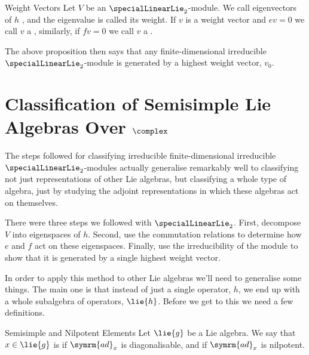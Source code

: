 \documentclass[fleqn]{NotesClass}
\newcommand{\ad}{\symrm{ad}}
\begin{document}
    \begin{dfn}{Weight Vectors}{}
        Let \(V\) be an \(\specialLinearLie_2\)-module.
        We call eigenvectors of \(h\) , and the eigenvalue is called its weight.
        If \(v\) is a weight vector and \(ev = 0\) we call \(v\) a , similarly, if \(fv = 0\) we call \(v\) a .
    \end{dfn}
    
    The above proposition then says that any finite-dimensional irreducible \(\specialLinearLie_2\)-module is generated by a highest weight vector, \(v_0\).
    
    \section{Classification of Semisimple Lie Algebras Over \texorpdfstring{\(\complex\)}{C}}
    The steps followed for classifying irreducible finite-dimensional irreducible \(\specialLinearLie_2\)-modules actually generalise remarkably well to classifying not just representations of other Lie algebras, but classifying a whole type of algebra, just by studying the adjoint representations in which these algebras act on themselves.
    
    There were three steps we followed with \(\specialLinearLie_2\).
    First, decompose \(V\) into eigenspaces of \(h\).
    Second, use the commutation relations to determine how \(e\) and \(f\) act on these eigenspaces.
    Finally, use the irreducibility of the module to show that it is generated by a single highest weight vector.
    
    In order to apply this method to other Lie algebras we'll need to generalise some things.
    The main one is that instead of just a single operator, \(h\), we end up with a whole subalgebra of operators, \(\lie{h}\).
    Before we get to this we need a few definitions.
    
    \begin{dfn}{Semisimple and Nilpotent Elements}{}
        Let \(\lie{g}\) be a Lie algebra.
        We say that \(x \in \lie{g}\) is  if \(\ad_x\) is diagonalisable, and  if \(\ad_x\) is nilpotent.
    \end{dfn}
    
\end{document}

